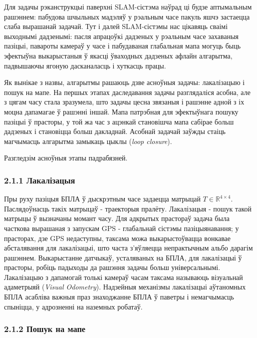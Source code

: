 Для задачы рэканструкцыі паверхні SLAM-сістэма наўрад ці будзе
аптымальным рашэннем: пабудова шчыльных мадэляў у рэальным часе пакуль яшчэ застаецца
слаба вырашанай задачай. Тут і далей SLAM-сістэмы нас цікавяць сваімі выходнымі
дадзенымі: пасля апрацоўкі дадзеных у рэальным часе захаваныя пазіцыі, павароты камераў
у часе і пабудаваная глабальная мапа могуць быць эфектыўна выкарыстаныя ў якасці
ўваходных дадзеных афлайн алгарытма, падвышаючы ягоную дасканаласць і хуткасць працы.

Як вынікае з назвы, алгарытмы рашаюць дзве асноўныя задачы: лакалізацыю і пошук на мапе.
На першых этапах даследавання задачы разглядаліся асобна, але з цягам часу стала зразумела,
што задачы цесна звязаныя і рашэнне адной з іх моцна дапамагае ў рашэнні іншай. Мапа патрэбная для
эфектыўнага пошуку пазіцыі ў прасторы, у той жа час з ацэнкай становішча мапа сабірае больш дадзеных
і становіцца больш дакладнай. Асобнай задачай заўжды стаіць магчымасць алгарытма
замыкаць цыклы (\textit{loop closure}).

Разгледзім асноўныя этапы падрабязней.

\subsubsection*{2.1.1 Лакалізацыя}

Пры руху пазіцыя БПЛА ў дыскрэтным часе задаецца матрыцай $T \in \mathbb{R}^{4\times4}$.
Паслядоўнасць такіх матрыцаў - траекторыя пралёту. Лакалізацыя - пошук такой матрыцы ў вызначаны момант часу.
Для адкрытых прастораў задача была часткова вырашаная з запускам GPS - глабальнай сістэмы
пазіцыянавання; у прасторах, дзе GPS недаступны, таксама можа выкарыстоўвацца вонкавае
абсталявання для лакалізацыі, што часта з'яўляецца непрактычным альбо дарагім рашэннем.
Выкарыстанне датчыкаў, усталяваных на БПЛА, для лакалізацыі ў прасторы, робіць падыходы
да рашэння задачы больш універсальнымі. Лакалізацыю з дапамогай толькі камераў часам
таксама называюць візуальнай адаметрыяй (\textit{Visual Odometry}). Надзейныя механізмы
лакалізацыі аўтаномных БПЛА асабліва важныя праз знаходжанне БПЛА ў паветры і
немагчымасць спыніцца, у адрозненні на наземных робатаў.

\subsubsection*{2.1.2 Пошук на мапе}

